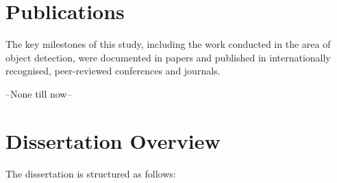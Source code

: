 \section{Publications}
\label{sec:publications}

The key milestones of this study, including the work conducted in the area of object detection, were documented in papers and published in internationally recognised, peer-reviewed conferences and journals.

--None till now--

\section{Dissertation Overview}
\label{sec:structure}

The dissertation is structured as follows:

